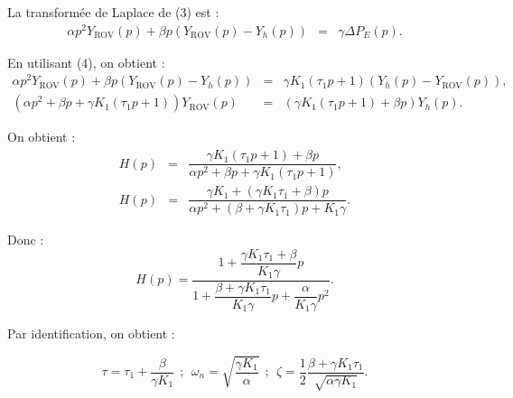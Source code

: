 \ifprof
\begin{corrige}
La transformée de Laplace de (3) est :
\begin{eqnarray}
\alpha p^2 Y_{\text{ROV}}(p)+\beta p \left(Y_{\text{ROV}}(p)-Y_h(p)\right)&=&\gamma \Delta P_E(p). \nonumber
\end{eqnarray}

En utilisant (4), on obtient :
\begin{eqnarray}
\alpha p^2 Y_{\text{ROV}}(p)+\beta p \left(Y_{\text{ROV}}(p)-Y_h(p)\right)&=&\gamma K_1\left(\tau_1 p+1\right)\left( Y_h(p)-  Y_{\text{ROV}}(p)\right), \nonumber\\
\left(\alpha p^2+\beta p+\gamma K_1\left(\tau_1 p+1\right)\right) Y_{\text{ROV}}(p)&=&\left(\gamma K_1\left(\tau_1 p+1\right)+\beta p\right) Y_h(p). \nonumber
\end{eqnarray}

On obtient :
\begin{eqnarray}
H(p)&= &\dfrac{\gamma K_1\left(\tau_1 p+1\right)+\beta p}{\alpha p^2+\beta p+\gamma K_1\left(\tau_1 p+1\right)},\nonumber \\
H(p)&= &\dfrac{\gamma K_1 + (\gamma K_1\tau_1+\beta)p}{\alpha p^2+(\beta +\gamma K_1\tau_1)p+K_1\gamma}.\nonumber 
\end{eqnarray}

Donc :
$$\boxed{H(p)=\dfrac{1+ \dfrac{\gamma K_1\tau_1+\beta}{K_1\gamma }p}{1 + \dfrac{\beta +\gamma K_1\tau_1}{K_1\gamma}p+ \dfrac{\alpha}{K_1\gamma} p^2}.}$$


Par identification, on obtient :

$$\tau=\tau_1+\dfrac{\beta}{\gamma K_1} \ \ ; \ \ \omega_n=\sqrt{\frac{\gamma K_1}{\alpha}} \ \ ; \ \ \zeta=\dfrac{1}{2}\dfrac{\beta+\gamma K_1 \tau_1}{\sqrt{\alpha \gamma K_1}}.$$


\end{corrige}
\else
\fi

